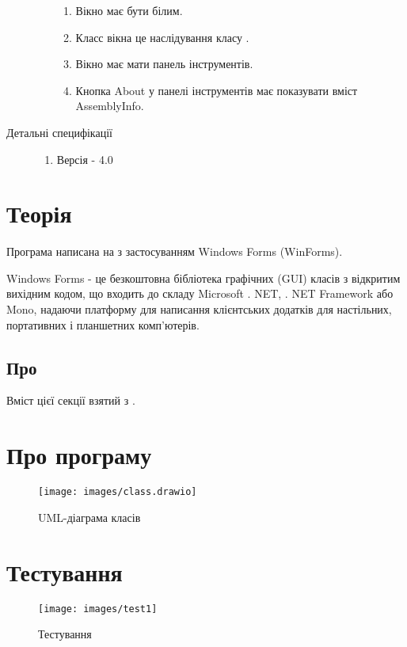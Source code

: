 \begin{description}
\begin{enumerate}
\begin{enumerate}
					\item Вікно має бути білим.
					\item Класс вікна  це наслідування класу .
					\item Вікно має мати панель інструментів.
					\item Кнопка About у панелі інструментів має показувати вміст AssemblyInfo.
				\end{enumerate}
		\end{enumerate}
	\item[Детальні специфікації]\directenv
		\begin{enumerate}
			\item Версія  - 4.0
		\end{enumerate}
\end{description}


\chapter{Теорія}
Програма написана на  з застосуванням Windows Forms (WinForms).

Windows Forms - це безкоштовна бібліотека графічних (GUI) класів з
відкритим вихідним кодом, що входить до складу Microsoft . NET, . NET Framework
або Mono, надаючи платформу для написання клієнтських додатків для настільних,
портативних і планшетних комп'ютерів.
\section{Про }
Вміст цієї секції взятий з \cite{mslearn}.
\begin{description}
	\item[\code{}]
\end{description}

\chapter{Про програму}

\begin{figure}[htb]
	\centering
	\texttt{[image: images/class.drawio]}
	\caption{UML-діаграма класів}
	\label{fig:classdiagram}
\end{figure}

\chapter{Тестування}
\begin{figure}[htb]
	\centering
	\texttt{[image: images/test1]}
	\caption{Тестування}
	\label{fig:tag}
\end{figure}

